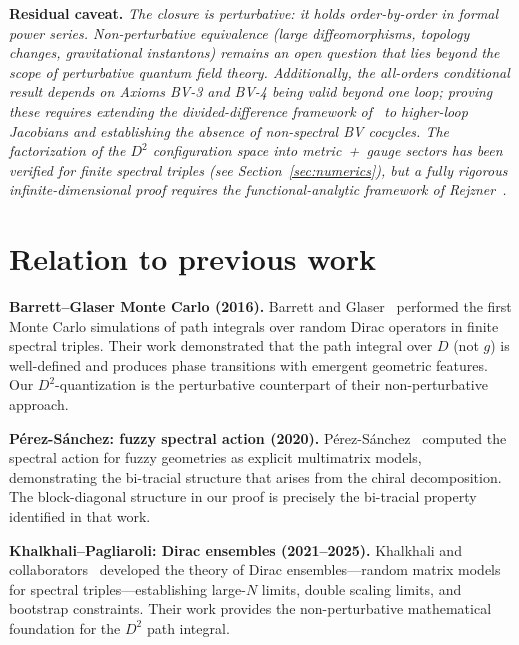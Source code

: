 \documentclass[12pt,a4paper]{article}
\theoremstyle{definition}
\theoremstyle{remark}
\begin{document}
\medskip
\noindent\textbf{Residual caveat.}
\emph{The closure is perturbative: it holds order-by-order in formal power
series.  Non-perturbative equivalence (large diffeomorphisms, topology
changes, gravitational instantons) remains an open question that lies
beyond the scope of perturbative quantum field theory.  Additionally, the
all-orders conditional result depends on Axioms BV-3 and BV-4 being valid
beyond one loop; proving these requires extending the divided-difference
framework of~\cite{vanNuland:2021oneloop} to higher-loop Jacobians and
establishing the absence of non-spectral BV cocycles.  The factorization of
the $D^2$ configuration space into metric~+~gauge sectors has been verified
for finite spectral triples (see Section~\ref{sec:numerics}), but a fully
rigorous infinite-dimensional proof requires the functional-analytic framework
of Rejzner~\cite{Rejzner:2016book}.}

\section{Relation to previous work}
\label{sec:related}

\textbf{Barrett--Glaser Monte Carlo (2016).}
Barrett and Glaser~\cite{Barrett:2016monte} performed the first Monte Carlo
simulations of path integrals over random Dirac operators in finite spectral
triples.  Their work demonstrated that the path integral over $D$ (not $g$) is
well-defined and produces phase transitions with emergent geometric features.
Our $D^2$-quantization is the perturbative counterpart of their
non-perturbative approach.

\smallskip\noindent
\textbf{P{\'e}rez-S{\'a}nchez: fuzzy spectral action (2020).}
P{\'e}rez-S{\'a}nchez~\cite{PerezSanchez:2020fuzzy} computed the spectral
action for fuzzy geometries as explicit multimatrix models, demonstrating the
bi-tracial structure that arises from the chiral decomposition.  The
block-diagonal structure in our proof is precisely the bi-tracial property
identified in that work.

\smallskip\noindent
\textbf{Khalkhali--Pagliaroli: Dirac ensembles (2021--2025).}
Khalkhali and collaborators~\cite{Khalkhali:2021dirac, Hessam:2022doublescaling,
Khalkhali:2025bootstrap} developed the theory of Dirac ensembles---random
matrix models for spectral triples---establishing large-$N$ limits, double
scaling limits, and bootstrap constraints.  Their work provides the
non-perturbative mathematical foundation for the $D^2$ path integral.
\end{document}
